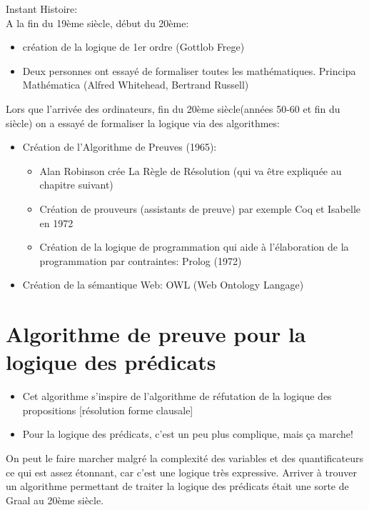 \hfill {\begin{minipage}{0.90\textwidth}
\begin{small}
{\large Instant Histoire:}\\
A la fin du 19ème siècle, début du 20ème: 
\begin{itemize}
\item création de la logique de 1er ordre (Gottlob Frege)
\item Deux personnes ont essayé de formaliser toutes les mathématiques. Principa Mathématica (Alfred Whitehead, Bertrand Russell)
\end{itemize}
Lors que l'arrivée des ordinateurs, fin du 20ème siècle(années 50-60 et fin du siècle) on a essayé de formaliser la logique via des algorithmes:
\begin{itemize}
\item Création de l'Algorithme de Preuves (1965):
\begin{itemize}
\item Alan Robinson crée La Règle de Résolution (qui va être expliquée au chapitre suivant)
\item Création de prouveurs (assistants de preuve) par exemple Coq et Isabelle en 1972
\item Création de la logique de programmation qui aide à l'élaboration de la programmation par contraintes: Prolog (1972) 
\end{itemize}
\item Création de la sémantique Web: OWL (Web Ontology Langage)
\end{itemize}
\end{small}
\end{minipage}

\chapter{Algorithme de preuve pour la logique des prédicats}
\label{algorithmepreuve}
\begin{itemize}
    \item Cet algorithme s'inspire de l'algorithme de réfutation de la logique des propositions [résolution forme clausale]
    \item Pour la logique des prédicats, c'est un peu plus complique, mais ça marche!
\end{itemize}
On peut le faire marcher malgré la complexité des variables et des quantificateurs ce qui est assez étonnant, car c'est une logique très expressive. 
Arriver à trouver un algorithme permettant de traiter la logique des prédicats était une sorte de Graal au 20ème siècle. 
}

